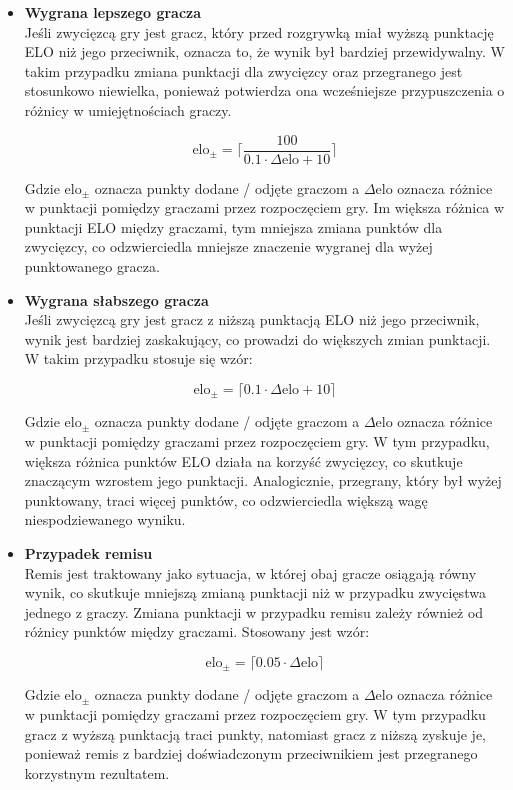 \documentclass[12pt,a4paper]{article}
\begin{document}
\begin{itemize}
    \item \textbf{Wygrana lepszego gracza}\\
    Jeśli zwycięzcą gry jest gracz, który przed rozgrywką miał wyższą punktację ELO niż jego przeciwnik, oznacza to, że wynik był bardziej przewidywalny. W takim przypadku zmiana punktacji dla zwycięzcy oraz przegranego jest stosunkowo niewielka, ponieważ potwierdza ona wcześniejsze przypuszczenia o różnicy w umiejętnościach graczy.

    \[ \text{elo}_{\pm} = \lceil \frac{100}{0.1 \cdot \Delta \text{elo} + 10} \rceil \]

    Gdzie $ \text{elo}_{\pm} $ oznacza punkty dodane / odjęte graczom a $ \Delta \text{elo} $ oznacza różnice w punktacji pomiędzy graczami przez rozpoczęciem gry. Im większa różnica w punktacji ELO między graczami, tym mniejsza zmiana punktów dla zwycięzcy, co odzwierciedla mniejsze znaczenie wygranej dla wyżej punktowanego gracza.

    \item \textbf{Wygrana słabszego gracza}\\
    Jeśli zwycięzcą gry jest gracz z niższą punktacją ELO niż jego przeciwnik, wynik jest bardziej zaskakujący, co prowadzi do większych zmian punktacji. W takim przypadku stosuje się wzór:

    \[ \text{elo}_{\pm} = \lceil 0.1 \cdot \Delta \text{elo} + 10 \rceil \]

    Gdzie $ \text{elo}_{\pm} $ oznacza punkty dodane / odjęte graczom a $ \Delta \text{elo} $ oznacza różnice w punktacji pomiędzy graczami przez rozpoczęciem gry. W tym przypadku, większa różnica punktów ELO działa na korzyść zwycięzcy, co skutkuje znaczącym wzrostem jego punktacji. Analogicznie, przegrany, który był wyżej punktowany, traci więcej punktów, co odzwierciedla większą wagę niespodziewanego wyniku.

    \item \textbf{Przypadek remisu}\\
    Remis jest traktowany jako sytuacja, w której obaj gracze osiągają równy wynik, co skutkuje mniejszą zmianą punktacji niż w przypadku zwycięstwa jednego z graczy. Zmiana punktacji w przypadku remisu zależy również od różnicy punktów między graczami. Stosowany jest wzór:

    \[ \text{elo}_{\pm} = \lceil 0.05 \cdot \Delta \text{elo} \rceil \]

    Gdzie $ \text{elo}_{\pm} $ oznacza punkty dodane / odjęte graczom a $ \Delta \text{elo} $ oznacza różnice w punktacji pomiędzy graczami przez rozpoczęciem gry.     W tym przypadku gracz z wyższą punktacją traci punkty, natomiast gracz z niższą zyskuje je, ponieważ remis z bardziej doświadczonym przeciwnikiem jest przegranego korzystnym rezultatem.

\end{itemize}
\end{document}
